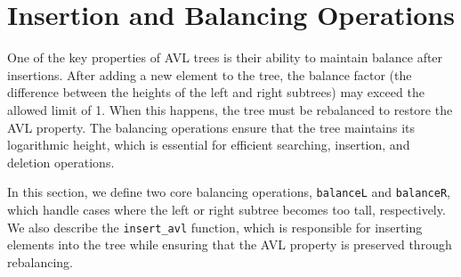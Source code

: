 \chapter{Insertion and Balancing Operations}\label{chap:LaTeXAdvice}

One of the key properties of AVL trees is their ability to maintain balance after insertions. After adding a new element to the tree, the balance factor (the difference between the heights of the left and right subtrees) may exceed the allowed limit of 1. When this happens, the tree must be rebalanced to restore the AVL property. The balancing operations ensure that the tree maintains its logarithmic height, which is essential for efficient searching, insertion, and deletion operations.

In this section, we define two core balancing operations, \texttt{balanceL} and \texttt{balanceR}, which handle cases where the left or right subtree becomes too tall, respectively. We also describe the \texttt{insert\_avl} function, which is responsible for inserting elements into the tree while ensuring that the AVL property is preserved through rebalancing.



